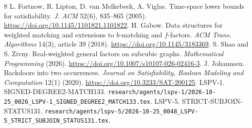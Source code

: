 \documentclass[11pt]{article}
\begin{document}
\begin{thebibliography}{8}\small
{} L. Fortnow, R. Lipton, D. van Melkebeek, A. Viglas.
Time-space lower bounds for satisfiability.
\emph{J. ACM} 52(6), 835--865 (2005).
\url{https://doi.org/10.1145/1101821.1101822}.
 H. Gabow.
Data structures for weighted matching and extensions to
\(b\)-matching and \(f\)-factors.
\emph{ACM Trans. Algorithms} 14(3), article 39 (2018).
\url{https://doi.org/10.1145/3183369}.
 S. Shao and S. Zivny.
Real-weighted general factors on subcubic graphs.
\emph{Mathematical Programming} (2026).
\url{https://doi.org/10.1007/s10107-026-02416-3}.
 J. Johannsen. Backdoors into two occurrences.
\emph{Journal on Satisfiability, Boolean Modeling and Computation}
12(1) (2020). \url{https://doi.org/10.3233/SAT-200125}.
 LSPV-1. SIGNED-DEGREE2-MATCH133.
\texttt{research/agents/lspv-1/2026-10-25\_0026\_LSPV-1\_SIGNED\_DEGREE2\_MATCH133.tex}.
 LSPV-5. STRICT-SUBJOIN-STATUS131.
\texttt{research/agents/lspv-5/2026-10-25\_0048\_LSPV-5\_STRICT\_SUBJOIN\_STATUS131.tex}.
\end{thebibliography}
\end{document}
